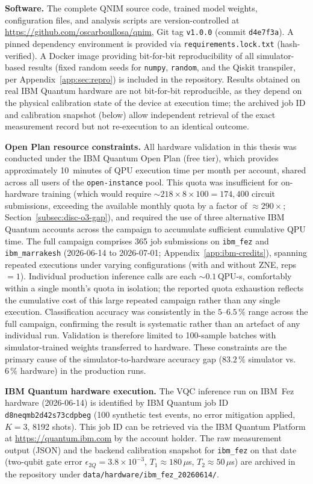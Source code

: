 \documentclass[11pt,a4paper, english]{book}
\theoremstyle{plain}
\theoremstyle{definition}
\numberwithin{equation}{chapter}
\numberwithin{figure}{chapter}
\numberwithin{table}{chapter}
\begin{document}
\noindent\textbf{Software.} The complete QNIM source code, trained model 
weights, configuration files, and analysis scripts are version-controlled 
at \url{https://github.com/oscarboullosa/qnim}, Git tag \texttt{v1.0.0} 
(commit \texttt{d4e7f3a}). A pinned dependency environment is provided 
via \texttt{requirements.lock.txt} (hash-verified). A Docker image 
providing bit-for-bit reproducibility of all simulator-based results
(fixed random seeds for \texttt{numpy}, \texttt{random}, and the
Qiskit transpiler, per Appendix~\ref{app:sec:repro}) is included in
the repository. Results obtained on real IBM Quantum hardware are
not bit-for-bit reproducible, as they depend on the physical
calibration state of the device at execution time; the archived
job ID and calibration snapshot (below) allow independent retrieval
of the exact measurement record but not re-execution to an identical
outcome.

\noindent\textbf{Open Plan resource constraints.}
All hardware validation in this thesis was conducted under the IBM
Quantum Open Plan (free tier), which provides approximately 10~minutes
of QPU execution time per month per account, shared across all users
of the \texttt{open-instance} pool.
This quota was insufficient for on-hardware training (which would
require ${\sim}218\times8\times100=174{,}400$ circuit submissions,
exceeding the available monthly quota by a factor of ${\approx}290\times$;
Section~\ref{subsec:disc-o3-gap}), and required the use of three
alternative IBM Quantum accounts across the campaign to accumulate
sufficient cumulative QPU time. The full campaign comprises 365 job
submissions on \texttt{ibm\_fez} and \texttt{ibm\_marrakesh}
(2026-06-14 to 2026-07-01; Appendix~\ref{app:ibm-credits}), spanning
repeated executions under varying configurations (with and without
ZNE, reps$=1$). Individual production inference calls are each
${\sim}0.1$\,QPU-s, comfortably within a single month's quota in
isolation; the reported quota exhaustion reflects the cumulative cost
of this large repeated campaign rather than any single execution.
Classification accuracy was consistently in the $5$--$6.5\,\%$ range
across the full campaign, confirming the result is systematic rather
than an artefact of any individual run. Validation is
therefore limited to 100-sample batches with simulator-trained
weights transferred to hardware.
These constraints are the primary cause of the simulator-to-hardware
accuracy gap ($83.2\,\%$ simulator vs.\ $6\,\%$ hardware) in
the production runs.


\noindent\textbf{IBM Quantum hardware execution.} The VQC inference run 
on IBM~Fez hardware (2026-06-14) is identified by IBM Quantum job ID 
\texttt{d8neqmb2d42s73cdpbeg} (100 synthetic test events, no error mitigation applied, 
$K=3$, 8192 shots). This job ID can be retrieved via the IBM Quantum 
Platform at \url{https://quantum.ibm.com} by the account holder. The 
raw measurement output (JSON) and the backend calibration snapshot for 
\texttt{ibm\_fez} on that date (two-qubit gate error 
$\epsilon_{2Q} = 3.8\times10^{-3}$, $T_1 \approx 180\,\mu$s, 
$T_2 \approx 50\,\mu$s) are archived in the repository under 
\texttt{data/hardware/ibm\_fez\_20260614/}.
\end{document}
